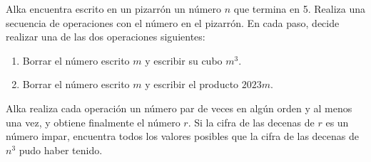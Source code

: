Alka encuentra escrito en un pizarrón un número $n$ que termina en 5. Realiza una secuencia de operaciones con el número en el pizarrón. En cada paso, decide realizar una de las dos operaciones siguientes:


 \begin{enumerate}  \item  Borrar el número escrito $m$ y escribir su cubo $m^3$.
 \item  Borrar el número escrito $m$ y escribir el producto $2023m$.
 \end{enumerate} 


Alka realiza cada operación un número par de veces en algún orden y al menos una vez, y obtiene finalmente el número $r$. Si la cifra de las decenas de $r$ es un número impar, encuentra todos los valores posibles que la cifra de las decenas de $n^3$ pudo haber tenido.